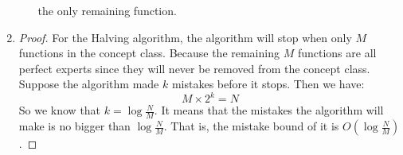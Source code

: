 \documentclass{article}
\begin{document}
\begin{enumerate}
\begin{enumerate}
\begin{algorithm}[H]
\begin{algorithmic}[1]
			\State \Return the only remaining function.
        \end{algorithmic}
        \end{algorithm}
		\end{enumerate}
	\item \begin{proof}
		For the Halving algorithm, the algorithm will stop when only $M$ functions in the concept class. Because the remaining  $M$ functions are all perfect experts since they will never be removed from the concept class. Suppose the algorithm made $k$ mistakes before it stops. Then we have:
		\begin{equation}
			M \times 2^k = N
		\end{equation}
		So we know that $k = \log{\frac{N}{M}}$. It means that the mistakes the algorithm will make is no bigger than $\log{\frac{N}{M}}$. That is, the mistake bound of it is $O(\log{\frac{N}{M}})$.
	\end{proof}
	\end{enumerate}
\end{document}
